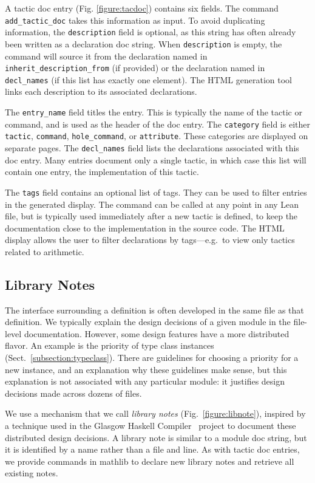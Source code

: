 \documentclass[runningheads]{llncs}
\newcommand{\mathlib}{\textsf{mathlib}\xspace}
\newcommand{\lean}[1]{\lstinline[language=lean]{#1}}
\begin{document}
A tactic doc entry (Fig. \ref{figure:tacdoc}) contains six fields.
The command \lean{add_tactic_doc} takes this information as input.
To avoid duplicating information,
the \lean{description} field is optional,
as this string has often already been written as a declaration doc string.
When \lean{description} is empty, the command will source it from
the declaration named in \lean{inherit_description_from} (if provided)
or the declaration named in \lean{decl_names} (if this list has exactly one element).
The HTML generation tool links each description to its associated declarations.

The \lean{entry_name} field titles the entry.
This is typically the name of the tactic or command,
and is used as the header of the doc entry.
The \lean{category} field is either \lean{tactic}, \lean{command},
\lean{hole_command}, or \lean{attribut}\lean{e}. %
These categories are displayed on separate pages.
The \lean{decl_names} field lists the declarations associated with this doc entry.
Many entries document only a single tactic,
in which case this list will contain one entry,
the implementation of this tactic.

The \lean{tags} field contains an optional list of tags.
They can be used to filter entries in the generated display.
The command can be called at any point in any Lean file,
but is typically used immediately after a new tactic is defined,
to keep the documentation close to the implementation in the source code.
The HTML display allows the user to filter declarations by tags---e.g.\,
to view only tactics related to arithmetic.


\subsection{Library Notes}
\label{subsection:libnote}

The interface surrounding a definition
is often developed in the same file as that definition.
We typically explain the design decisions of a given module
in the file-level documentation.
However, some design features have a more distributed flavor.
An example is the priority of type class instances (Sect.~\ref{subsection:typeclass}).
There are guidelines for choosing a priority for a new instance,
and an explanation why these guidelines make sense,
but this explanation is not associated with any particular module:
it justifies design decisions made across dozens of files.

We use a mechanism that we call \emph{library notes} (Fig.~\ref{figure:libnote}),
inspired by a technique used in the Glasgow Haskell Compiler~\cite{Marl12} project
to document these distributed design decisions.
A library note is similar to a module doc string,
but it is identified by a name
rather than a file and line.
As with tactic doc entries,
we provide commands in \mathlib
to declare new library notes
and retrieve all existing notes.
\end{document}
